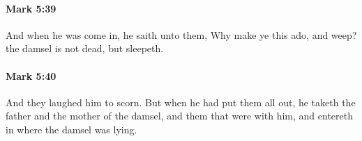 		\paragraph{Mark 5:39} %
			\label{MARK-5-39}

			And when he was come in, he saith unto them, Why make ye this ado, and weep? the damsel is not dead, but sleepeth.

			\begin{framed}
			\scriptsize
				\begin{compactdesc}
					\item[SBLG] 
				\end{compactdesc}
			\end{framed}

		\paragraph{Mark 5:40} %
			\label{MARK-5-40}

			And they laughed him to scorn. But when he had put them all out, he taketh the father and the mother of the damsel, and them that were with him, and entereth in where the damsel was lying.

